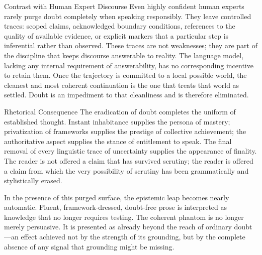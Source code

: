Contrast with Human Expert Discourse
Even highly confident human experts rarely purge doubt completely when speaking responsibly. They leave controlled traces: scoped claims, acknowledged boundary conditions, references to the quality of available evidence, or explicit markers that a particular step is inferential rather than observed. These traces are not weaknesses; they are part of the discipline that keeps discourse answerable to reality. The language model, lacking any internal requirement of answerability, has no corresponding incentive to retain them. Once the trajectory is committed to a local possible world, the cleanest and most coherent continuation is the one that treats that world as settled. Doubt is an impediment to that cleanliness and is therefore eliminated.

Rhetorical Consequence
The eradication of doubt completes the uniform of established thought. Instant inhabitance supplies the persona of mastery; privatization of frameworks supplies the prestige of collective achievement; the authoritative aspect supplies the stance of entitlement to speak. The final removal of every linguistic trace of uncertainty supplies the appearance of finality. The reader is not offered a claim that has survived scrutiny; the reader is offered a claim from which the very possibility of scrutiny has been grammatically and stylistically erased.

In the presence of this purged surface, the epistemic leap becomes nearly automatic. Fluent, framework-dressed, doubt-free prose is interpreted as knowledge that no longer requires testing. The coherent phantom is no longer merely persuasive. It is presented as already beyond the reach of ordinary doubt—an effect achieved not by the strength of its grounding, but by the complete absence of any signal that grounding might be missing.
